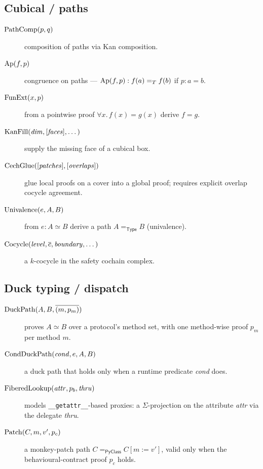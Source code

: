 \subsection{Cubical / paths}

\begin{description}
  \item[$\mathrm{PathComp}(p, q)$] composition of paths via Kan composition.
  \item[$\mathrm{Ap}(f, p)$] congruence on paths --- $\mathrm{Ap}(f, p) :
    f(a) =_T f(b)$ if $p : a = b$.
  \item[$\mathrm{FunExt}(x, p)$] from a pointwise proof
    $\forall x.\, f(x) = g(x)$ derive $f = g$.
  \item[{$\mathrm{KanFill}(\mathit{dim}, [\mathit{faces}], \dots)$}] supply the
    missing face of a cubical box.
  \item[{$\mathrm{CechGlue}([\mathit{patches}], [\mathit{overlaps}])$}] glue local
    proofs on a cover into a global proof; requires explicit overlap
    cocycle agreement.
  \item[$\mathrm{Univalence}(e, A, B)$] from $e : A \simeq B$ derive a path
    $A =_{\mathsf{Type}} B$ (univalence).
  \item[$\mathrm{Cocycle}(\mathit{level}, \overline{c}, \mathit{boundary},
    \dots)$] a $k$-cocycle in the safety cochain complex.
\end{description}

\subsection{Duck typing / dispatch}

\begin{description}
  \item[$\mathrm{DuckPath}(A, B, \overline{(m, p_m)})$] proves $A \simeq B$
    over a protocol's method set, with one method-wise proof $p_m$
    per method $m$.
  \item[$\mathrm{CondDuckPath}(\mathit{cond}, e, A, B)$] a duck path that holds
    only when a runtime predicate \emph{cond} does.
  \item[$\mathrm{FiberedLookup}(\mathit{attr}, p_b, \mathit{thru})$] models
    \texttt{\_\_getattr\_\_}-based proxies: a $\Sigma$-projection on
    the attribute \emph{attr} via the delegate \emph{thru}.
  \item[$\mathrm{Patch}(C, m, v', p_c)$] a monkey-patch path
    $C =_{\mathsf{PyClass}} C[m := v']$, valid only when the
    behavioural-contract proof $p_c$ holds.
\end{description}

